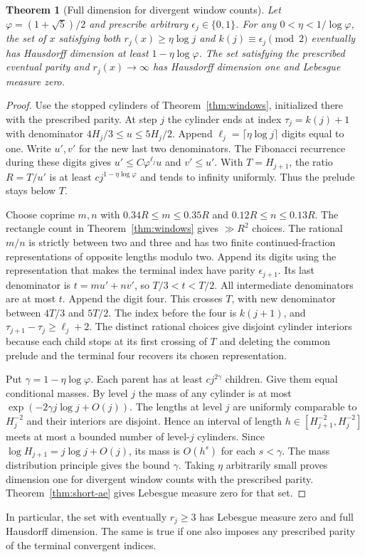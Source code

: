 \documentclass[11pt]{article}
\newtheorem{theorem}{Theorem}
\theoremstyle{definition}
\theoremstyle{remark}
\begin{document}
\begin{theorem}[Full dimension for divergent window counts]\label{thm:no-short-dim}
Let $\varphi=(1+\sqrt5)/2$ and prescribe arbitrary
$\epsilon_j\in\{0,1\}$. For any $0<\eta<1/\log\varphi$, the set of
$x$ satisfying both $r_j(x)\ge\eta\log j$ and
$k(j)\equiv\epsilon_j\pmod2$ eventually has Hausdorff dimension at
least $1-\eta\log\varphi$. The set satisfying the prescribed
eventual parity and $r_j(x)\to\infty$ has Hausdorff dimension one
and Lebesgue measure zero.
\end{theorem}
\begin{proof}
Use the stopped cylinders of Theorem~\ref{thm:windows}, initialized
there with the prescribed parity. At step $j$ the cylinder ends
at index $\tau_j=k(j)+1$ with denominator
$4H_j/3\le u\le5H_j/2$. Append $\ell_j=\lceil\eta\log j\rceil$
digits equal to one. Write $u',v'$ for the new last two denominators.
The Fibonacci recurrence during these digits gives
$u'\le C\varphi^{\ell_j}u$ and $v'\le u'$. With $T=H_{j+1}$,
the ratio $R=T/u'$ is at least $c j^{1-\eta\log\varphi}$ and tends
to infinity uniformly. Thus the prelude stays below $T$.

Choose coprime $m,n$ with
$0.34R\le m\le0.35R$ and $0.12R\le n\le0.13R$.
The rectangle count in Theorem~\ref{thm:windows} gives
$\gg R^2$ choices. The rational $m/n$ is strictly between two and
three and has two finite continued-fraction representations of
opposite lengths modulo two. Append its digits using the
representation that makes the terminal index have parity
$\epsilon_{j+1}$. Its last denominator is $t=mu'+nv'$, so
$T/3<t<T/2$. All intermediate denominators are at most $t$.
Append the digit four. This crosses $T$, with new denominator
between $4T/3$ and $5T/2$. The index before the four is $k(j+1)$,
and $\tau_{j+1}-\tau_j\ge\ell_j+2$. The distinct rational choices
give disjoint cylinder interiors because each child stops at
its first crossing of $T$ and deleting the common prelude and the
terminal four recovers its chosen representation.

Put $\gamma=1-\eta\log\varphi$. Each parent has at least
$c j^{2\gamma}$ children. Give them equal conditional masses.
By level $j$ the mass of any cylinder is at most
$\exp(-2\gamma j\log j+O(j))$. The lengths at level $j$ are uniformly
comparable to $H_j^{-2}$ and their interiors are disjoint. Hence
an interval of length $h\in[H_{j+1}^{-2},H_j^{-2}]$ meets at most
a bounded number of level-$j$ cylinders. Since
$\log H_{j+1}=j\log j+O(j)$, its mass is $O(h^s)$ for each
$s<\gamma$. The mass distribution principle gives the bound
$\gamma$. Taking $\eta$ arbitrarily small proves dimension one
for divergent window counts with the prescribed parity.
Theorem~\ref{thm:short-ae} gives Lebesgue measure zero for that set.
\end{proof}
In particular, the set with eventually $r_j\ge3$ has Lebesgue
measure zero and full Hausdorff dimension. The same is true if one
also imposes any prescribed parity of the terminal convergent
indices.
\end{document}
